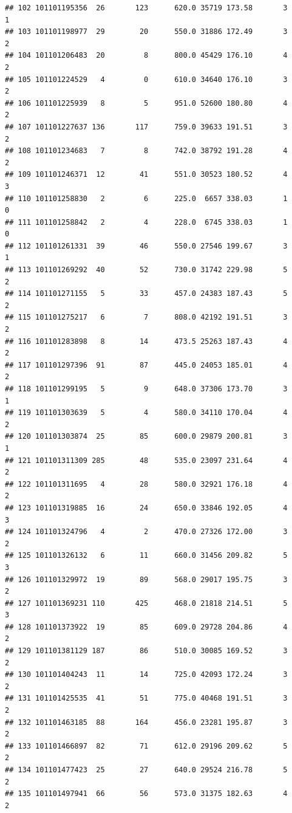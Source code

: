 \documentclass[
]{article}
\begin{document}
\begin{verbatim}
## 102 101101195356  26       123      620.0 35719 173.58       3          1
## 103 101101198977  29        20      550.0 31886 172.49       3          2
## 104 101101206483  20         8      800.0 45429 176.10       4          2
## 105 101101224529   4         0      610.0 34640 176.10       3          2
## 106 101101225939   8         5      951.0 52600 180.80       4          2
## 107 101101227637 136       117      759.0 39633 191.51       3          2
## 108 101101234683   7         8      742.0 38792 191.28       4          2
## 109 101101246371  12        41      551.0 30523 180.52       4          3
## 110 101101258830   2         6      225.0  6657 338.03       1          0
## 111 101101258842   2         4      228.0  6745 338.03       1          0
## 112 101101261331  39        46      550.0 27546 199.67       3          1
## 113 101101269292  40        52      730.0 31742 229.98       5          2
## 114 101101271155   5        33      457.0 24383 187.43       5          2
## 115 101101275217   6         7      808.0 42192 191.51       3          2
## 116 101101283898   8        14      473.5 25263 187.43       4          2
## 117 101101297396  91        87      445.0 24053 185.01       4          2
## 118 101101299195   5         9      648.0 37306 173.70       3          1
## 119 101101303639   5         4      580.0 34110 170.04       4          2
## 120 101101303874  25        85      600.0 29879 200.81       3          1
## 121 101101311309 285        48      535.0 23097 231.64       4          2
## 122 101101311695   4        28      580.0 32921 176.18       4          2
## 123 101101319885  16        24      650.0 33846 192.05       4          3
## 124 101101324796   4         2      470.0 27326 172.00       3          2
## 125 101101326132   6        11      660.0 31456 209.82       5          3
## 126 101101329972  19        89      568.0 29017 195.75       3          2
## 127 101101369231 110       425      468.0 21818 214.51       5          3
## 128 101101373922  19        85      609.0 29728 204.86       4          2
## 129 101101381129 187        86      510.0 30085 169.52       3          2
## 130 101101404243  11        14      725.0 42093 172.24       3          2
## 131 101101425535  41        51      775.0 40468 191.51       3          2
## 132 101101463185  88       164      456.0 23281 195.87       3          2
## 133 101101466897  82        71      612.0 29196 209.62       5          2
## 134 101101477423  25        27      640.0 29524 216.78       5          2
## 135 101101497941  66        56      573.0 31375 182.63       4          2

\end{verbatim}
\end{document}
